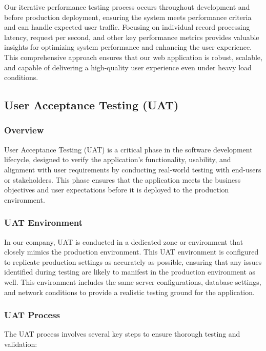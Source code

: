 \documentclass[12pt,a4paper]{report}
\begin{document}
Our iterative performance testing process occurs throughout development and before production deployment, ensuring the system meets performance criteria and can handle expected user traffic. Focusing on individual record processing latency, request per second, and other key performance metrics provides valuable insights for optimizing system performance and enhancing the user experience. This comprehensive approach ensures that our web application is robust, scalable, and capable of delivering a high-quality user experience even under heavy load conditions.



\subsection{User Acceptance Testing (UAT)}

\subsubsection{Overview}

User Acceptance Testing (UAT) is a critical phase in the software development lifecycle, designed to verify the application's functionality, usability, and alignment with user requirements by conducting real-world testing with end-users or stakeholders. This phase ensures that the application meets the business objectives and user expectations before it is deployed to the production environment.

\subsubsection{UAT Environment}

In our company, UAT is conducted in a dedicated zone or environment that closely mimics the production environment. This UAT environment is configured to replicate production settings as accurately as possible, ensuring that any issues identified during testing are likely to manifest in the production environment as well. This environment includes the same server configurations, database settings, and network conditions to provide a realistic testing ground for the application.

\subsubsection{UAT Process}

The UAT process involves several key steps to ensure thorough testing and validation:
\end{document}
